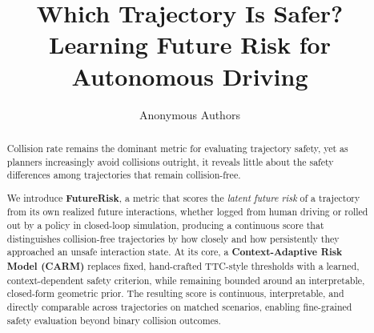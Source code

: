 \documentclass[letterpaper, 10 pt, conference]{ieeeconf}  %
\title{Which Trajectory Is Safer? Learning Future Risk for Autonomous Driving
}
\author{Anonymous Authors}
\begin{document}
\maketitle
\thispagestyle{empty}
\pagestyle{empty}


\begin{abstract}

Collision rate remains the dominant metric for evaluating trajectory safety, yet as planners increasingly avoid collisions outright, 
it reveals little about the safety differences among trajectories that remain collision-free. 


We introduce \textbf{FutureRisk}, a metric that scores the \emph{latent future risk} of a trajectory from its own realized future interactions, whether logged from human driving or rolled out by a policy in closed-loop simulation, producing a continuous score that distinguishes collision-free trajectories by how closely and how persistently they approached an unsafe interaction state. At its core, a \textbf{Context-Adaptive Risk Model (CARM)} replaces fixed, hand-crafted TTC-style thresholds with a learned, context-dependent safety criterion, while remaining bounded around an interpretable, closed-form geometric prior. The resulting score is continuous, interpretable, and directly comparable across trajectories on matched scenarios, enabling fine-grained safety evaluation beyond binary collision outcomes. 


\end{abstract}
\end{document}
